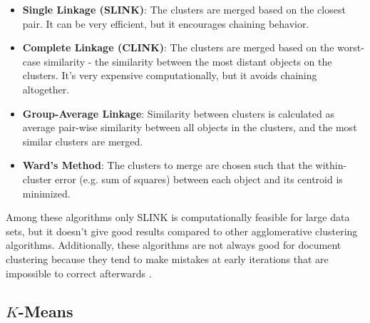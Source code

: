 \begin{itemize}
\itemsep1pt\parskip0pt
  \item \textbf{Single Linkage (SLINK)}: The clusters are merged based
on the closest pair. It can be very efficient, but it encourages
chaining behavior.


  \item \textbf{Complete Linkage (CLINK)}: The clusters are merged
  based on the worst-case similarity - the similarity between the most
  distant objects on the clusters. It's very expensive computationally,
  but it avoids chaining altogether.


  \item \textbf{Group-Average Linkage}: Similarity between clusters
  is calculated as average pair-wise similarity between all objects
  in the clusters, and the most similar clusters are merged.

  \item \textbf{Ward's Method}: The clusters to merge are chosen such that the within-cluster
  error (e.g. sum of squares) between each object and its centroid
  is minimized.


\end{itemize}


Among these algorithms only SLINK is computationally feasible
for large data sets, but it doesn't give good results compared to other
agglomerative clustering algorithms. Additionally, these algorithms
are not always good for document clustering because they tend to
make mistakes at early iterations that are impossible to correct
afterwards \cite{steinbach2000comparison}.



\subsection{$K$-Means} \label{sec:kmeans}

